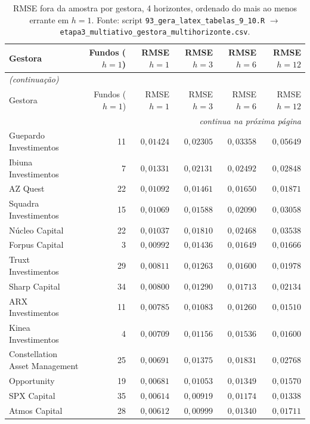 \documentclass[11pt,a4paper]{article}
\begin{document}
\begin{center}\scriptsize
\begin{longtable}{@{}lrrrrr@{}}
\caption{RMSE fora da amostra por gestora, 4 horizontes, ordenado do mais ao menos errante em
$h=1$. Fonte: script \texttt{93\_gera\_latex\_tabelas\_9\_10.R} $\to$
\texttt{etapa3\_multiativo\_gestora\_multihorizonte.csv}.}
\label{tab:rmse-gestora}\\
\toprule
Gestora & Fundos ($h{=}1$) & RMSE $h{=}1$ & RMSE $h{=}3$ & RMSE $h{=}6$ & RMSE $h{=}12$ \\
\midrule
\endfirsthead
\multicolumn{6}{l}{\textit{(continuação)}}\\
\toprule
Gestora & Fundos ($h{=}1$) & RMSE $h{=}1$ & RMSE $h{=}3$ & RMSE $h{=}6$ & RMSE $h{=}12$ \\
\midrule
\endhead
\midrule
\multicolumn{6}{r}{\textit{continua na próxima página}}\\
\endfoot
\bottomrule
\endlastfoot
Guepardo Investimentos & 11 & $0{,}01424$ & $0{,}02305$ & $0{,}03358$ & $0{,}05649$ \\
Ibiuna Investimentos & 7 & $0{,}01331$ & $0{,}02131$ & $0{,}02492$ & $0{,}02848$ \\
AZ Quest & 22 & $0{,}01092$ & $0{,}01461$ & $0{,}01650$ & $0{,}01871$ \\
Squadra Investimentos & 15 & $0{,}01069$ & $0{,}01588$ & $0{,}02090$ & $0{,}03058$ \\
Núcleo Capital & 22 & $0{,}01037$ & $0{,}01810$ & $0{,}02468$ & $0{,}03538$ \\
Forpus Capital & 3 & $0{,}00992$ & $0{,}01436$ & $0{,}01649$ & $0{,}01666$ \\
Truxt Investimentos & 29 & $0{,}00811$ & $0{,}01263$ & $0{,}01600$ & $0{,}01978$ \\
Sharp Capital & 34 & $0{,}00800$ & $0{,}01290$ & $0{,}01713$ & $0{,}02134$ \\
ARX Investimentos & 11 & $0{,}00785$ & $0{,}01083$ & $0{,}01260$ & $0{,}01510$ \\
Kinea Investimentos & 4 & $0{,}00709$ & $0{,}01156$ & $0{,}01536$ & $0{,}01600$ \\
Constellation Asset Management & 25 & $0{,}00691$ & $0{,}01375$ & $0{,}01831$ & $0{,}02768$ \\
Opportunity & 19 & $0{,}00681$ & $0{,}01053$ & $0{,}01349$ & $0{,}01570$ \\
SPX Capital & 35 & $0{,}00614$ & $0{,}00919$ & $0{,}01174$ & $0{,}01338$ \\
Atmos Capital & 28 & $0{,}00612$ & $0{,}00999$ & $0{,}01340$ & $0{,}01711$ \\

\end{longtable}
\end{center}
\end{document}
